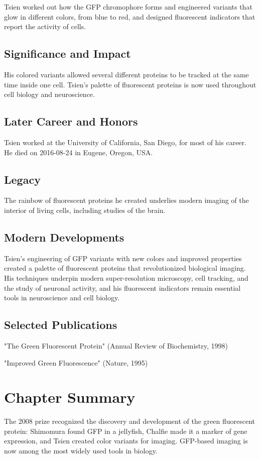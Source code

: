 Tsien worked out how the GFP chromophore forms and engineered variants that glow in different colors, from blue to red, and designed fluorescent indicators that report the activity of cells.

\subsection*{Significance and Impact}

His colored variants allowed several different proteins to be tracked at the same time inside one cell. Tsien's palette of fluorescent proteins is now used throughout cell biology and neuroscience.

\subsection*{Later Career and Honors}

Tsien worked at the University of California, San Diego, for most of his career. He died on 2016-08-24 in Eugene, Oregon, USA.

\subsection*{Legacy}

The rainbow of fluorescent proteins he created underlies modern imaging of the interior of living cells, including studies of the brain.

\subsection*{Modern Developments}

Tsien's engineering of GFP variants with new colors and improved properties created a palette of fluorescent proteins that revolutionized biological imaging. His techniques underpin modern super-resolution microscopy, cell tracking, and the study of neuronal activity, and his fluorescent indicators remain essential tools in neuroscience and cell biology.

\subsection*{Selected Publications}

"The Green Fluorescent Protein" (Annual Review of Biochemistry, 1998)

"Improved Green Fluorescence" (Nature, 1995)

\clearpage

\section*{Chapter Summary}

The 2008 prize recognized the discovery and development of the green fluorescent protein: Shimomura found GFP in a jellyfish, Chalfie made it a marker of gene expression, and Tsien created color variants for imaging. GFP-based imaging is now among the most widely used tools in biology.
